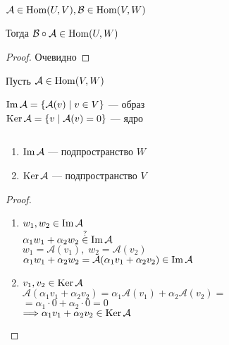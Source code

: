 \begin{theorem-non}
    $\mathcal{A} \in \operatorname{Hom}(U, V), \mathcal{B} \in \operatorname{Hom}(V, W)$

    Тогда $\mathcal{B} \circ \mathcal{A} \in \operatorname{Hom}(U,W)$

    \begin{proof}
        Очевидно
    \end{proof}

\end{theorem-non}

\begin{conj}
    Пусть $\mathcal{A} \in \operatorname{Hom}(V,W)$

    \begin{center}
        $\operatorname{Im} \mathcal{A} = \{ \mathcal{A}(v) \;|\; v \in V \}$ --- образ \\
        $\operatorname{Ker} \mathcal{A} = \{ v \;|\; \mathcal{A}(v) = 0 \}$ --- ядро
    \end{center}

\end{conj}

\begin{theorem-non}
    $ $ 

    \begin{enumerate}
        \item $\operatorname{Im} \mathcal{A}$ --- подпространство $W$
        \item $\operatorname{Ker} \mathcal{A}$ --- подпространство $V$
    \end{enumerate}
    
    \begin{proof}
        $ $

        \begin{enumerate}
            \item 
            \begin{flushleft}
                $w_1, w_2 \in \operatorname{Im} \mathcal{A}$ \\
                $\alpha_1w_1 + \alpha_2w_2 \stackrel{?}{\in} \operatorname{Im} \mathcal{A}$ \\
                $w_1 = \mathcal{A}(v_1),\; w_2 = \mathcal{A}(v_2)$ \\
                $\alpha_1w_1 + \alpha_2w_2 = \mathcal{A}(\alpha_1v_1 + \alpha_2v_2) \in \operatorname{Im} \mathcal{A}$ 
            \end{flushleft}
            \item
            \begin{flushleft}
                $v_1, v_2 \in \operatorname{Ker} \mathcal{A}$ \\
                $\mathcal{A}(\alpha_1v_1 + \alpha_2v_2) = \alpha_1 \mathcal{A}(v_1) + \alpha_2 \mathcal{A}(v_2) = $ \\
                $ = \alpha_1 \cdot 0 + \alpha_2 \cdot 0 = 0$ \\
                $ \Longrightarrow \alpha_1 v_1 + \alpha_2 v_2 \in \operatorname{Ker} \mathcal{A}$
            \end{flushleft}
        \end{enumerate}

    \end{proof}

\end{theorem-non}

